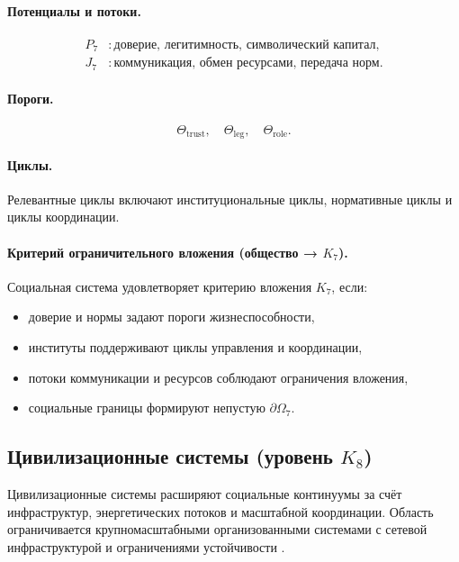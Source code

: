 \paragraph{Потенциалы и потоки.}
\[
\begin{aligned}
  P_7 &: \text{доверие, легитимность, символический капитал},\\
  J_7 &: \text{коммуникация, обмен ресурсами, передача норм}.
\end{aligned}
\]

\paragraph{Пороги.}
\[
  \Theta_{\mathrm{trust}},\quad
  \Theta_{\mathrm{leg}},\quad
  \Theta_{\mathrm{role}}.
\]

\paragraph{Циклы.}
Релевантные циклы включают институциональные циклы, нормативные циклы и
циклы координации.

\paragraph{Критерий ограничительного вложения (общество →
            \texorpdfstring{$K_7$}{K7}).}
Социальная система удовлетворяет критерию вложения \(K_7\), если:
\begin{itemize}
  \item доверие и нормы задают пороги жизнеспособности,
  \item институты поддерживают циклы управления и координации,
  \item потоки коммуникации и ресурсов соблюдают ограничения вложения,
  \item социальные границы формируют непустую \(\partial\Omega_7\).
\end{itemize}

\subsection{Цивилизационные системы (уровень
            \texorpdfstring{$K_8$}{K8})}

Цивилизационные системы расширяют социальные континуумы за счёт
инфраструктур, энергетических потоков и масштабной координации.
Область ограничивается крупномасштабными организованными системами с
сетевой инфраструктурой и ограничениями устойчивости
\parencite{newman_networks,may_stability_complexity}.

